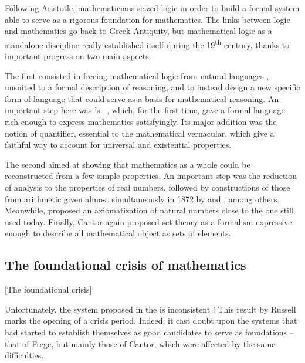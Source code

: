 Following Aristotle, mathematicians seized logic in order to build a formal system
able to serve as a rigorous foundation for mathematics.
The links between logic and mathematics go back to Greek Antiquity, but
mathematical logic as a standalone discipline really established itself
during the 19\textsuperscript{th} century, thanks to important progress on two main aspects.

The first consisted in freeing mathematical logic from natural languages%
,
unsuited to a formal description of reasoning, and to instead design a new specific
form of language that could serve as a basis for mathematical reasoning.
An important step here was \citeauthor{Begriffsschrift}'s
~, which, for the first time,
gave a formal language rich enough to express mathematics satisfyingly. Its
major addition was the notion of quantifier, essential to the mathematical vernacular,
which give a faithful way to account for universal%
and existential%
properties.

The second aimed at showing that mathematics as a whole could be reconstructed from a
few simple properties. An important step was the reduction of analysis to the properties
of real numbers, followed by constructions of those from arithmetic given almost
simultaneously in 1872 by  and
, among others.
Meanwhile,  proposed an axiomatization of natural numbers close to the
one still used today. Finally, Cantor again proposed set theory 
as a formalism expressive enough to describe all mathematical object as sets of elements.

\subsection{The foundational crisis of mathematics}[The foundational crisis]

Unfortunately, the system proposed in the  is inconsistent%
 !
This result by Russell%
%
marks the opening of a crisis period.
Indeed, it cast doubt upon the systems that had started to establish
themselves as good candidates to serve as foundations – that of Frege, but
mainly those of Cantor, which were affected by the same difficulties.

